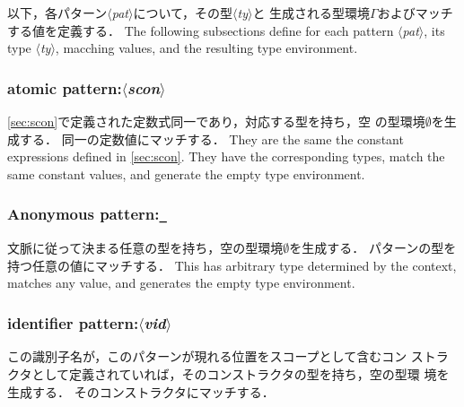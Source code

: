 \documentclass{jbook}
\newcommand{\txt}[2]{#2}
\newcommand{\nonterm}[1]{\mbox{$\langle$}{\it #1}\mbox{$\rangle$}}
\newcommand{\term}[1]{\mbox{{\tt #1}}}
\newcommand{\ass}{\Gamma}
\begin{document}
\ifjp%
	以下，各パターン\nonterm{pat}について，その型\nonterm{ty}と
生成される型環境$\ass$およびマッチする値を定義する．
\else%
	The following subsections define for each pattern \nonterm{pat},
its type \nonterm{ty}, macching values, and the resulting type environment.
\fi%

\subsubsection{\txt{基底パターン}{atomic pattern}:\nonterm{scon}}

\ifjp%
	\ref{sec:scon}で定義された定数式同一であり，対応する型を持ち，空
の型環境$\emptyset$を生成する．
	同一の定数値にマッチする．
\else%
	They are the same the constant expressions defined in \ref{sec:scon}.
	They have the corresponding types, match the same constant
values, and generate the empty type environment.
\fi%

\subsubsection{\txt{匿名パターン}{Anonymous pattern}:\term{\_}}

\ifjp%
	文脈に従って決まる任意の型を持ち，空の型環境$\emptyset$を生成する．
	パターンの型を持つ任意の値にマッチする．
\else%
	This has arbitrary type determined by the context, matches any value,
and generates the empty type environment.
\fi%

\subsubsection{\txt{識別子パターン}{identifier pattern}:\nonterm{vid}}

\ifjp%
	この識別子名が，このパターンが現れる位置をスコープとして含むコン
ストラクタとして定義されていれば，そのコンストラクタの型を持ち，空の型環
境を生成する．
	そのコンストラクタにマッチする．
\end{document}
